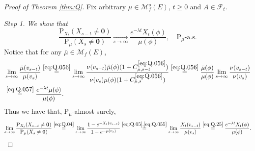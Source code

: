 \documentclass[12pt,a4paper]{amsart}
\numberwithin{equation}{section}
\theoremstyle{plain}
\theoremstyle{definition}
\theoremstyle{remark}
\begin{document}
\begin{proof}[Proof of Theorem \ref{thm:Q}]
	Fix arbitrary $\mu\in \mathcal M^o_f(E)$, $t\ge 0$ and $A\in\mathscr F_t$.
	
\emph{Step 1. We show that
	\begin{equation} \label{eq:Q.1}
		\frac{\mathrm P_{X_t}(X_{s-t} \neq \mathbf 0)}{\mathrm P_\mu(X_{s} \neq \mathbf 0)}
		\xrightarrow[s\to \infty]{} \frac{e^{-\lambda t}X_t(\phi)}{\mu(\phi) },
		\quad \mathrm P_\mu\text{-a.s.}
\end{equation}}	
	Notice that for any $\bar \mu\in \mathcal M_f(E)$,
	\begin{align}
		&\lim_{s\rightarrow\infty}\dfrac{ \bar \mu(v_{s-t}) }{ \mu(v_s) }
		\overset{\eqref{eq:Q.056}}=\lim_{s\to \infty} \frac{\nu(v_{s-t})\bar \mu (\phi) (1+C_{\bar \mu,s-t}^{\eqref{eq:Q.056}})}{\nu(v_s)\mu(\phi)(1+C_{\mu,s}^{\eqref{eq:Q.056}})}
		\overset{\eqref{eq:Q.056}}= \frac{\bar \mu(\phi)}{\mu(\phi)}\lim_{s\to \infty} \frac{\nu(v_{s-t}) }{\nu(v_s)}
		\\\label{eq:Q.25}&\overset{\eqref{eq:Q.057}}= \frac{e^{-\lambda t} \bar \mu(\phi)}{\mu(\phi)}.
	\end{align}
	Thus we have that, $\mathrm P_\mu$-almost surely,
	\begin{equation}
		\lim_{s\to\infty}\frac{\mathrm P_{X_t}(X_{s-t}\neq \mathbf 0)}{\mathrm P_\mu(X_s\neq \mathbf 0)}
		\overset{\eqref{eq:Q.04}}=\lim_{s\to\infty}\frac{1-e^{- X_t(v_{s-t}) }}{1-e^{- \mu(v_s) }}
		\overset{\eqref{eq:Q.05},\eqref{eq:Q.055}}=\lim_{s\rightarrow\infty}\dfrac{ X_t(v_{s-t}) }{ \mu(v_s) }
		\overset{\eqref{eq:Q.25}}= \frac{e^{-\lambda t} X_t(\phi)}{\mu(\phi)}. 
	\end{equation}


\end{proof}
\end{document}
